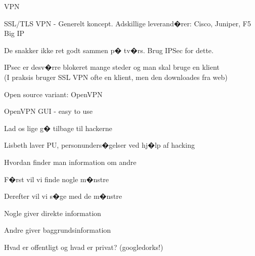 \documentclass[20pt,landscape,a4paper,footrule]{foils}
\begin{document}

\centerline{}



\begin{list1}
\item VPN 
\item SSL/TLS VPN - Generelt koncept. Adskillige leverand�rer: Cisco, Juniper, F5 Big IP
\item De snakker ikke ret godt sammen p� tv�rs. Brug IPSec for dette.
\item IPsec er desv�rre blokeret mange steder og man skal bruge en klient\\
(I praksis bruger SSL VPN ofte en klient, men den downloades fra web)
\item Open source variant: OpenVPN
\end{list1}


\centerline{OpenVPN GUI - easy to use}




\centerline{Lad os lige g� tilbage til hackerne}


\begin{list1}
\item Lisbeth laver PU, personunders�gelser ved hj�lp af hacking
\item Hvordan finder man information om andre
\end{list1}


\begin{list1}
\item F�rst vil vi finde nogle m�nstre
\item Derefter vil vi s�ge med de m�nstre
\item Nogle giver direkte information
\item Andre giver baggrundsinformation
\item Hvad er offentligt og hvad er privat? (googledorks!)
\end{list1}

\end{document}
